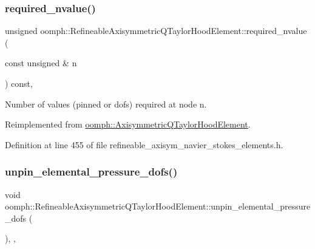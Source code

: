 \subsubsection{\texorpdfstring{required\+\_\+nvalue()}{required\_nvalue()}}
{\footnotesize\ttfamily unsigned oomph\+::\+Refineable\+Axisymmetric\+Q\+Taylor\+Hood\+Element\+::required\+\_\+nvalue (\begin{DoxyParamCaption}\item[{const unsigned \&}]{n }\end{DoxyParamCaption}) const\hspace{0.3cm}{\ttfamily [inline]}, {\ttfamily [virtual]}}



Number of values (pinned or dofs) required at node n. 



Reimplemented from \hyperlink{classoomph_1_1AxisymmetricQTaylorHoodElement_a89c18769297b69e2e3522d83c8b68d73}{oomph\+::\+Axisymmetric\+Q\+Taylor\+Hood\+Element}.



Definition at line 455 of file refineable\+\_\+axisym\+\_\+navier\+\_\+stokes\+\_\+elements.\+h.

\mbox{\label{classoomph_1_1RefineableAxisymmetricQTaylorHoodElement_a8f9a8ab37c89caf1460ee47dc667a4f0}} 
\subsubsection{\texorpdfstring{unpin\+\_\+elemental\+\_\+pressure\+\_\+dofs()}{unpin\_elemental\_pressure\_dofs()}}
{\footnotesize\ttfamily void oomph\+::\+Refineable\+Axisymmetric\+Q\+Taylor\+Hood\+Element\+::unpin\+\_\+elemental\+\_\+pressure\+\_\+dofs (\begin{DoxyParamCaption}{ }\end{DoxyParamCaption})\hspace{0.3cm}{\ttfamily [inline]}, {\ttfamily [private]}, {\ttfamily [virtual]}}




